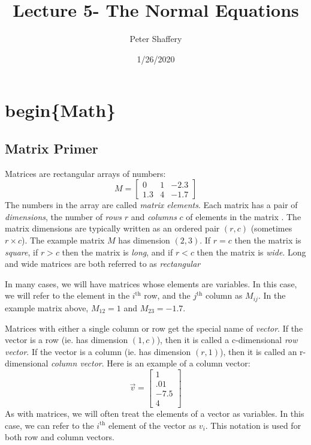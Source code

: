\documentclass[
]{article}
\title{Lecture 5- The Normal Equations}
\author{Peter Shaffery}
\date{1/26/2020}
\begin{document}
\maketitle

\hypertarget{beginmath}{%
\section{begin\{Math\}}\label{beginmath}}

\hypertarget{matrix-primer}{%
\subsection{Matrix Primer}\label{matrix-primer}}

Matrices are rectangular arrays of numbers: \[
M = \left[
\begin{array}{ccc}
0 & 1 & -2.3 \\
1.3 & 4 & -1.7
\end{array}
\right]
\] The numbers in the array are called \emph{matrix elements}. Each
matrix has a pair of \emph{dimensions}, the number of \emph{rows} \(r\)
and \emph{columns} \(c\) of elements in the matrix . The matrix
dimensions are typically written as an ordered pair \((r,c)\) (sometimes
\(r \times c\)). The example matrix \(M\) has dimension \((2,3)\). If
\(r=c\) then the matrix is \emph{square}, if \(r>c\) then the matrix is
\emph{long}, and if \(r<c\) then the matrix is \emph{wide}. Long and
wide matrices are both referred to as \emph{rectangular}

In many cases, we will have matrices whose elements are variables. In
this case, we will refer to the element in the \(i^{\text{th}}\) row,
and the \(j^{\text{th}}\) column as \(M_{ij}\). In the example matrix
above, \(M_{12} = 1\) and \(M_{23} = -1.7\).

Matrices with either a single column or row get the special name of
\emph{vector}. If the vector is a row (ie. has dimension \((1,c)\)),
then it is called a c-dimensional \emph{row vector}. If the vector is a
column (ie. has dimension \((r,1)\)), then it is called an r-dimensional
\emph{column vector}. Here is an example of a column vector: \[
\vec{v} = \left[
\begin{array}{c}
1\\
.01\\
-7.5\\
4
\end{array}
\right]
\] As with matrices, we will often treat the elements of a vector as
variables. In this case, we can refer to the \(i^{\text{th}}\) element
of the vector as \(v_i\). This notation is used for both row and column
vectors.
\end{document}
